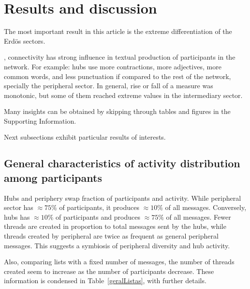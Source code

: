 \documentclass[%
 aip,
 jmp,%
 amsmath,amssymb,
 reprint,%
]{revtex4-1}
\begin{document}

\section{Results and discussion}\label{sec:results}

The most important result in this article is the
extreme differentiation of the Erd\"os sectors.


, connectivity has strong influence in textual production of participants in the network.
For example: hubs use more contractions, more adjectives, more common words, and less punctuation if compared to the rest of the network, specially the peripheral sector.
In general, rise or fall of a measure was monotonic, but some of them reached extreme values in the intermediary sector.

Many insights can be obtained by skipping through tables and figures in the Supporting Information.

Next subsections exhibit particular results of interests.

\subsection{General characteristics of activity distribution among participants}\label{sec:gen}
Hubs and periphery swap fraction of participants and activity. While peripheral sector has $\approx 75\%$ of participants, it produces $\approx 10\%$ of all messages. Conversely, hubs has $\approx 10\%$ of participants and produces $\approx 75\%$ of all messages. Fewer threads are created in proportion to total messages sent by the hubs, while threads created by peripheral are twice as frequent as general peripheral messages.
This suggests a symbiosis of peripheral diversity and hub activity. 

Also, comparing lists with a fixed number of messages, the number of threads created seem to increase as the number of participants decrease. These information is condensed in Table~\ref{geralListas}, with further details.
\end{document}
